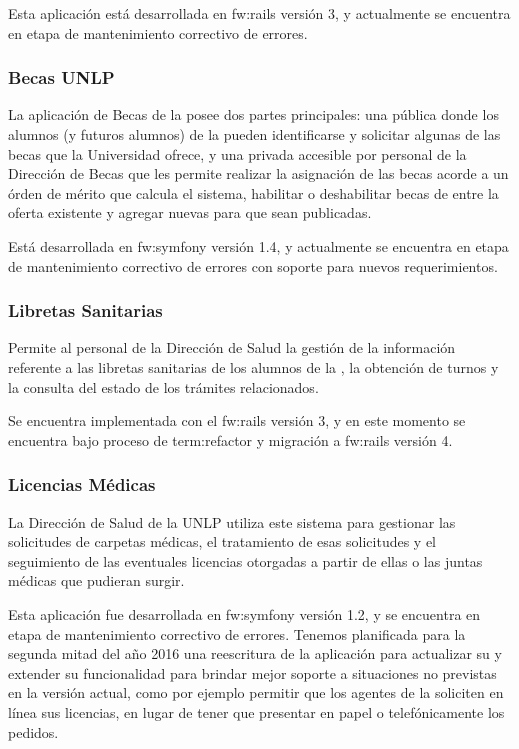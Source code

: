 Esta aplicación está desarrollada en \gls{fw:rails} versión 3, y actualmente se encuentra en etapa de mantenimiento correctivo de errores.


\subsubsection{Becas UNLP}
\label{anexo:detalle-clientes:becas}

La aplicación de Becas de la \unlp posee dos partes principales: una pública donde los alumnos (y futuros alumnos) de la \unlp pueden identificarse y solicitar algunas de las becas que la Universidad ofrece, y una privada accesible por personal de la Dirección de Becas que les permite realizar la asignación de las becas acorde a un órden de mérito que calcula el sistema, habilitar o deshabilitar becas de entre la oferta existente y agregar nuevas para que sean publicadas.

Está desarrollada en \gls{fw:symfony} versión 1.4, y actualmente se encuentra en etapa de mantenimiento correctivo de errores con soporte para nuevos requerimientos.


\subsubsection{Libretas Sanitarias}
\label{anexo:detalle-clientes:libretas}

Permite al personal de la Dirección de Salud la gestión de la información referente a las libretas sanitarias de los alumnos de la \unlp, la obtención de turnos y la consulta del estado de los trámites relacionados.

Se encuentra implementada con el  \gls{fw:rails} versión 3, y en este momento se encuentra bajo proceso de \gls{term:refactor} y migración a \gls{fw:rails} versión 4.


\subsubsection{Licencias Médicas}
\label{anexo:detalle-clientes:licencias}

La Dirección de Salud de la UNLP utiliza este sistema para gestionar las solicitudes de carpetas médicas, el tratamiento de esas solicitudes y el seguimiento de las eventuales licencias otorgadas a partir de ellas o las juntas médicas que pudieran surgir.

Esta aplicación fue desarrollada en \gls{fw:symfony} versión 1.2, y se encuentra en etapa de mantenimiento correctivo de errores. Tenemos planificada para la segunda mitad del año 2016 una reescritura de la aplicación para actualizar su  y extender su funcionalidad para brindar mejor soporte a situaciones no previstas en la versión actual, como por ejemplo permitir que los agentes de la \unlp soliciten en línea sus licencias, en lugar de tener que presentar en papel o telefónicamente los pedidos.


